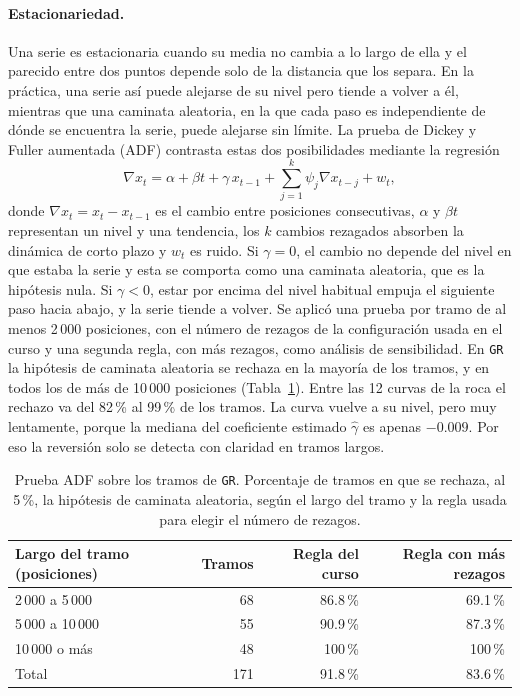 \documentclass[11pt,a4paper]{article}
\begin{document}
\paragraph{Estacionariedad.} Una serie es estacionaria cuando su media no cambia a lo largo de ella y el parecido entre dos puntos depende solo de la distancia que los separa. En la práctica, una serie así puede alejarse de su nivel pero tiende a volver a él, mientras que una caminata aleatoria, en la que cada paso es independiente de dónde se encuentra la serie, puede alejarse sin límite. La prueba de Dickey y Fuller aumentada (ADF) contrasta estas dos posibilidades mediante la regresión
\begin{equation}
\nabla x_t = \alpha + \beta t + \gamma\, x_{t-1} + \sum_{j=1}^{k} \psi_j \nabla x_{t-j} + w_t ,
\end{equation}
donde $\nabla x_t = x_t - x_{t-1}$ es el cambio entre posiciones consecutivas, $\alpha$ y $\beta t$ representan un nivel y una tendencia, los $k$ cambios rezagados absorben la dinámica de corto plazo y $w_t$ es ruido. Si $\gamma = 0$, el cambio no depende del nivel en que estaba la serie y esta se comporta como una caminata aleatoria, que es la hipótesis nula. Si $\gamma < 0$, estar por encima del nivel habitual empuja el siguiente paso hacia abajo, y la serie tiende a volver. Se aplicó una prueba por tramo de al menos 2\,000 posiciones, con el número de rezagos de la configuración usada en el curso y una segunda regla, con más rezagos, como análisis de sensibilidad. En \texttt{GR} la hipótesis de caminata aleatoria se rechaza en la mayoría de los tramos, y en todos los de más de 10\,000 posiciones (Tabla~\ref{tab:adf}). Entre las 12 curvas de la roca el rechazo va del 82\,\% al 99\,\% de los tramos. La curva vuelve a su nivel, pero muy lentamente, porque la mediana del coeficiente estimado $\hat{\gamma}$ es apenas $-0.009$. Por eso la reversión solo se detecta con claridad en tramos largos.

\begin{table}[htbp]
\centering
\small
\caption{Prueba ADF sobre los tramos de \texttt{GR}. Porcentaje de tramos en que se rechaza, al 5\,\%, la hipótesis de caminata aleatoria, según el largo del tramo y la regla usada para elegir el número de rezagos.}
\label{tab:adf}
\begin{tabular}{lrrr}
\toprule
\textbf{Largo del tramo (posiciones)} & \textbf{Tramos} & \textbf{Regla del curso} & \textbf{Regla con más rezagos} \\
\midrule
2\,000 a 5\,000 & 68 & 86.8\,\% & 69.1\,\% \\
5\,000 a 10\,000 & 55 & 90.9\,\% & 87.3\,\% \\
10\,000 o más & 48 & 100\,\% & 100\,\% \\
\midrule
Total & 171 & 91.8\,\% & 83.6\,\% \\
\bottomrule
\end{tabular}
\end{table}
\end{document}
